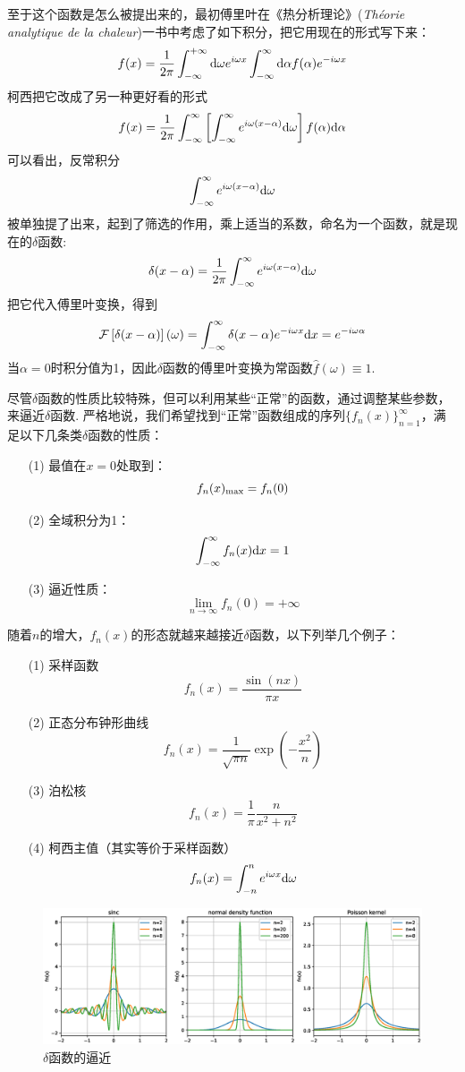 \documentclass[main.tex]{subfiles}
\begin{document}
至于这个函数是怎么被提出来的，最初傅里叶在《热分析理论》(\textit{Théorie analytique de la chaleur})一书中考虑了如下积分，把它用现在的形式写下来：
\[f(x) = \frac{1}{2\pi}\int_{-\infty}^{+\infty}{\rm d}\omega e^{i\omega x} \int_{-\infty}^{\infty}{\rm d}\alpha f(\alpha)e^{-i\omega x}\]
柯西把它改成了另一种更好看的形式
\[f(x) = \frac{1}{2\pi}\int_{-\infty}^{\infty}\left[\int_{-\infty}^{\infty}e^{i\omega(x-\alpha)}{\rm d}\omega\right]f(\alpha){\rm d}\alpha\]
可以看出，反常积分\[\int_{-\infty}^{\infty}e^{i\omega(x-\alpha)}{\rm d}\omega\]被单独提了出来，起到了筛选的作用，乘上适当的系数，命名为一个函数，就是现在的\(\delta\)函数:
\[\delta(x-\alpha)=\frac{1}{2\pi}\int_{-\infty}^{\infty}e^{i\omega(x-\alpha)}{\rm d}\omega\]
把它代入傅里叶变换，得到
\[\mathcal{F}\left[\delta(x-\alpha)\right](\omega) = \int_{-\infty}^{\infty}\delta(x-\alpha)e^{-i\omega x}{\rm d}x = e^{-i\omega\alpha}\]
当\(\alpha=0\)时积分值为1，因此\(\delta\)函数的傅里叶变换为常函数\(\hat{f}(\omega)\equiv 1\).

\vspace{1cm}

尽管\(\delta\)函数的性质比较特殊，但可以利用某些“正常”的函数，通过调整某些参数，来逼近\(\delta\)函数. 严格地说，我们希望找到“正常”函数组成的序列\(\{f_n(x)\}_{n=1}^{\infty}\)，满足以下几条类\(\delta\)函数的性质：
\begin{itemize}
    \item[(1)] 最值在\(x=0\)处取到：\[f_n(x)_{{\rm max}}=f_n(0)\]
    \item[(2)] 全域积分为1：\[\int_{-\infty}^{\infty}f_n(x){\rm d}x=1\] 
    \item[(3)] 逼近性质：\[\lim_{n\to\infty}f_n(0)=+\infty\] 
\end{itemize}
随着\(n\)的增大，\(f_n(x)\)的形态就越来越接近\(\delta\)函数，以下列举几个例子：
\begin{itemize}
    \item [(1)] 采样函数
    \[f_n(x)=\frac{\sin(nx)}{\pi x}\]
    \item [(2)] 正态分布钟形曲线
    \[f_n(x)=\frac{1}{\sqrt{\pi n}}\exp\left(-\frac{x^2}{n}\right)\]
    \item [(3)] 泊松核
    \[f_n(x) = \frac{1}{\pi}\frac{n}{x^2+n^2}\]
    \item [(4)] 柯西主值（其实等价于采样函数）
    \[f_n(x) = \int_{-n}^{n}e^{i\omega x}{\rm d}\omega\]
\end{itemize}

\begin{figure}[hbtp]
    \centering
    \includegraphics[width=\textwidth]{deltaapprox.eps}
    \caption{\(\delta\)函数的逼近}
\end{figure}
\end{document}
